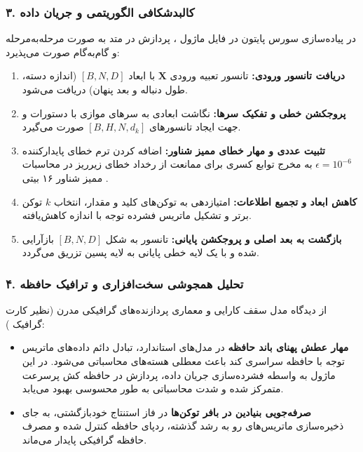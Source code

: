 \subsubsection*{۳. کالبدشکافی الگوریتمی و جریان داده }
در پیاده‌سازی سورس پایتون در فایل ماژول ، پردازش در متد  به صورت مرحله‌به‌مرحله و گام‌به‌گام صورت می‌پذیرد:
\begin{enumerate}
\item \textbf{دریافت تانسور ورودی:} تانسور تعبیه ورودی $\mathbf{X}$ با ابعاد $[B, N, D]$ (اندازه دسته، طول دنباله و بعد پنهان) دریافت می‌شود.
\item \textbf{پروجکشن خطی و تفکیک سرها:} نگاشت ابعادی به سرهای موازی با دستورات  و  جهت ایجاد تانسورهای $[B, H, N, d_k]$ صورت می‌گیرد.
\item \textbf{تثبیت عددی و مهار خطای ممیز شناور:} اضافه کردن ترم خطای پایدارکننده $\epsilon = 10^{-6}$ به مخرج توابع کسری برای ممانعت از رخداد خطای زیرریز  در محاسبات ممیز شناور ۱۶ بیتی .
\item \textbf{کاهش ابعاد و تجمیع اطلاعات:} امتیازدهی به توکن‌های کلید و مقدار، انتخاب $k$ توکن برتر و تشکیل ماتریس فشرده توجه با اندازه کاهش‌یافته.
\item \textbf{بازگشت به بعد اصلی و پروجکشن پایانی:} تانسور به شکل $[B, N, D]$ بازآرایی شده و با یک لایه خطی پایانی به لایه پسین تزریق می‌گردد.
\end{enumerate}

\subsubsection*{۴. تحلیل همجوشی سخت‌افزاری و ترافیک حافظه }
از دیدگاه مدل سقف کارایی  و معماری پردازنده‌های گرافیکی مدرن (نظیر کارت گرافیک ):
\begin{itemize}
\item \textbf{مهار عطش پهنای باند حافظه } \rl{:}  در مدل‌های استاندارد، تبادل دائم داده‌های ماتریس توجه با حافظه سراسری کند  باعث معطلی هسته‌های محاسباتی می‌شود. در این ماژول به واسطه فشرده‌سازی جریان داده، پردازش در حافظه کش پرسرعت  متمرکز شده و شدت محاسباتی  به طور محسوسی بهبود می‌یابد.
\item \textbf{صرفه‌جویی بنیادین در بافر توکن‌ها } \rl{:}  در فاز استنتاج خودبازگشتی، به جای ذخیره‌سازی ماتریس‌های رو به رشد گذشته، ردپای حافظه کنترل شده و مصرف حافظه گرافیکی پایدار می‌ماند.
\end{itemize}

